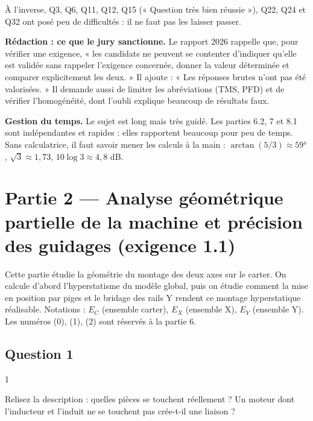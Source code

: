 \documentclass[11pt,a4paper]{article}
\begin{document}
À l'inverse, Q3, Q6, Q11, Q12, Q15 (« Question très bien réussie »), Q22, Q24 et Q32 ont posé peu de difficultés : il ne faut pas les laisser passer.

\textbf{Rédaction : ce que le jury sanctionne.} Le rapport 2026 rappelle que, pour vérifier une exigence, « les candidats ne peuvent se contenter d'indiquer qu'elle est validée sans rappeler l'exigence concernée, donner la valeur déterminée et comparer explicitement les deux. » Il ajoute : « Les réponses brutes n'ont pas été valorisées. » Il demande aussi de limiter les abréviations (TMS, PFD) et de vérifier l'homogénéité, dont l'oubli explique beaucoup de résultats faux.

\textbf{Gestion du temps.} Le sujet est long mais très guidé. Les parties 6.2, 7 et 8.1 sont indépendantes et rapides : elles rapportent beaucoup pour peu de temps. Sans calculatrice, il faut savoir mener les calculs à la main : \(\arctan(5/3)\approx 59°\), \(\sqrt3\approx1{,}73\), \(10\log3\approx4{,}8\) dB.

\hypertarget{partie-2-analyse-guxe9omuxe9trique-partielle-de-la-machine-et-pruxe9cision-des-guidages-exigence-1.1}{%
\section{Partie 2 --- Analyse géométrique partielle de la machine et précision des guidages (exigence 1.1)}\label{partie-2-analyse-guxe9omuxe9trique-partielle-de-la-machine-et-pruxe9cision-des-guidages-exigence-1.1}}

Cette partie étudie la géométrie du montage des deux axes sur le carter. On calcule d'abord l'hyperstatisme du modèle global, puis on étudie comment la mise en position par piges et le bridage des rails Y rendent ce montage hyperstatique réalisable. Notations : \(E_C\) (ensemble carter), \(E_X\) (ensemble X), \(E_Y\) (ensemble Y). Les numéros (0), (1), (2) sont réservés à la partie 6.

\hypertarget{question-1}{%
\subsection{Question 1}\label{question-1}}

\begin{indication}{1}

Relisez la description : quelles pièces se touchent réellement ? Un moteur dont l'inducteur et l'induit ne se touchent pas crée-t-il une liaison ?

\end{indication}
\end{document}
